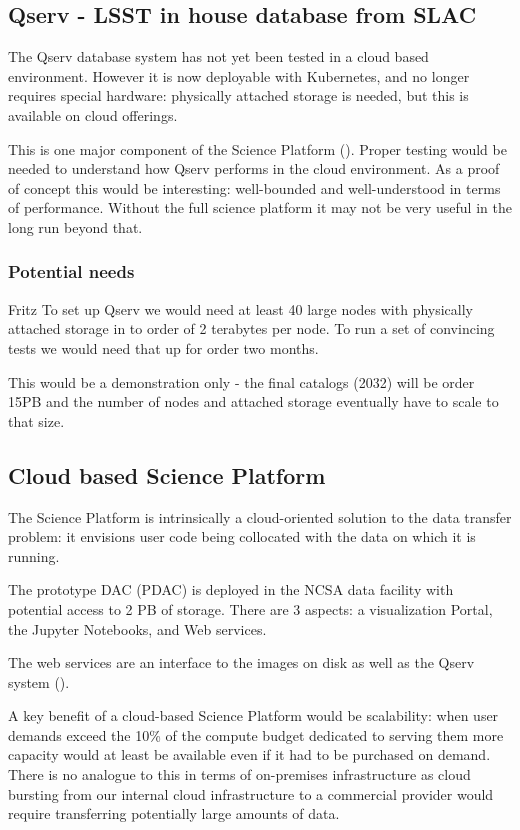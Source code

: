 \subsection{Qserv - LSST in house database from SLAC}\label{sect:qserv}
The Qserv database system  has not yet been tested in a cloud based environment.
However it is now deployable with Kubernetes, and no longer requires special hardware: physically attached storage is needed, but this is available on cloud offerings.

This is one major component of the Science Platform ().
Proper testing would be needed to understand how Qserv performs in the cloud environment. As a proof of concept this would be interesting: well-bounded and well-understood in terms of performance. Without the full science platform it may not be very useful in the long run beyond that.

\subsubsection{Potential needs} \label{sect:qservneeds}
{\color{red} Fritz }
To set up Qserv  we would need at least 40 large nodes with physically attached storage in to order of 2 terabytes per node.
To run a set of convincing tests we would need that up for order two months.

This would be a  demonstration only - the final catalogs (2032) will be order 15PB and the number of nodes and attached storage eventually have to scale to that size.

\subsection{Cloud based Science Platform}
\label{sect:platform}

The Science Platform  is intrinsically a cloud-oriented solution to the data transfer problem: it envisions user code being collocated with the data on which it is running.

The prototype DAC (PDAC) is deployed in the NCSA data facility with potential access to 2 PB of storage. There are 3 aspects: a visualization  Portal, the Jupyter Notebooks, and Web services.

The web services are an interface to the images on disk as well as the Qserv system ().

A key benefit of a cloud-based Science Platform would be scalability: when user demands exceed the 10\% of the compute budget dedicated to serving them more capacity would at least be available even if it had to be purchased on demand.
There is no analogue to this in terms of on-premises infrastructure as cloud bursting from our internal cloud infrastructure to a commercial provider would require transferring potentially large amounts of data.

